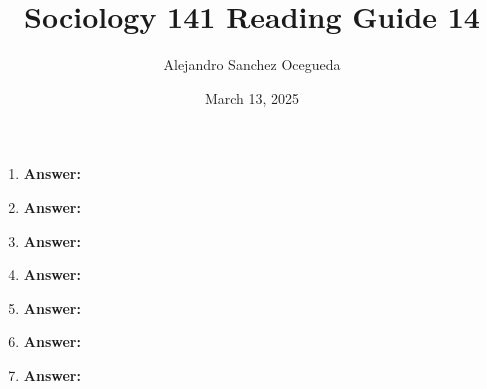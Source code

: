 \documentclass{article}
\title{Sociology 141 Reading Guide 14}
\author{Alejandro Sanchez Ocegueda}
\date{March 13, 2025}
\newcommand{\answer}{\textbf{Answer:}$\;$}
\begin{document}
\maketitle

\begin{enumerate}[label=\arabic*)]
    \item 
    
    \answer 
    
    \item 
    
    \answer 
    
    
    \item 
   

    \answer
    
    \item 
    
    \answer 
    
    \item 
    
    \answer
    

    \item 
    
    \answer
    
    \item 
    
    \answer
    
\end{enumerate}
 
\end{document}
